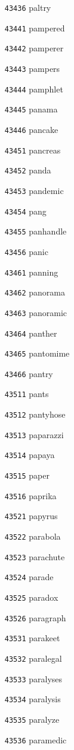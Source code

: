 \documentclass[twoside,11pt]{article}
\begin{document}
\begin{multicols}{5}
\begin{enumerate}
\item[\texttt{43436}] paltry
\item[\texttt{43441}] pampered
\item[\texttt{43442}] pamperer
\item[\texttt{43443}] pampers
\item[\texttt{43444}] pamphlet
\item[\texttt{43445}] panama
\item[\texttt{43446}] pancake
\item[\texttt{43451}] pancreas
\item[\texttt{43452}] panda
\item[\texttt{43453}] pandemic
\item[\texttt{43454}] pang
\item[\texttt{43455}] panhandle
\item[\texttt{43456}] panic
\item[\texttt{43461}] panning
\item[\texttt{43462}] panorama
\item[\texttt{43463}] panoramic
\item[\texttt{43464}] panther
\item[\texttt{43465}] pantomime
\item[\texttt{43466}] pantry
\item[\texttt{43511}] pants
\item[\texttt{43512}] pantyhose
\item[\texttt{43513}] paparazzi
\item[\texttt{43514}] papaya
\item[\texttt{43515}] paper
\item[\texttt{43516}] paprika
\item[\texttt{43521}] papyrus
\item[\texttt{43522}] parabola
\item[\texttt{43523}] parachute
\item[\texttt{43524}] parade
\item[\texttt{43525}] paradox
\item[\texttt{43526}] paragraph
\item[\texttt{43531}] parakeet
\item[\texttt{43532}] paralegal
\item[\texttt{43533}] paralyses
\item[\texttt{43534}] paralysis
\item[\texttt{43535}] paralyze
\item[\texttt{43536}] paramedic

\end{enumerate}
\end{multicols}
\end{document}
